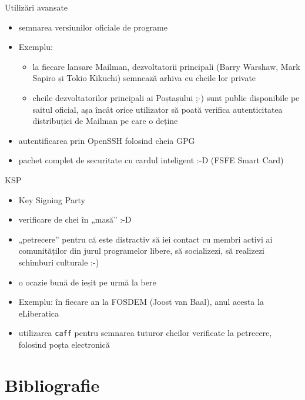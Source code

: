 \documentclass{beamer}
\begin{document}
\begin{frame}{Utilizări avansate}
  \begin{itemize}
    \item semnarea versiunilor oficiale de programe
    \item Exemplu:
    \begin{itemize}
      \item la fiecare lansare Mailman, dezvoltatorii principali (Barry
      Warshaw, Mark Sapiro și Tokio Kikuchi) semnează arhiva cu cheile lor
      private
      \item cheile dezvoltatorilor principali ai Poștașului ;-) sunt
      public disponibile pe saitul oficial, așa încât orice utilizator să
      poată verifica autenticitatea distribuției de Mailman pe care o deține
    \end{itemize}
    \item autentificarea prin OpenSSH folosind cheia GPG
    \item pachet complet de securitate cu cardul inteligent :-D (FSFE Smart
    Card)
  \end{itemize}
\end{frame}

\begin{frame}{KSP}
  \begin{itemize}
    \item Key Signing Party
    \item verificare de chei în „masă” :-D
    \item „petrecere” pentru că este distractiv să iei contact cu membri
    activi ai comunităților din jurul programelor libere, să socializezi,
    să realizezi schimburi culturale :-)
    \item o ocazie bună de ieșit pe urmă la bere
    \item Exemplu: în fiecare an la FOSDEM (Joost van Baal), anul acesta la
    eLiberatica
    \item utilizarea \texttt{caff} pentru semnarea tuturor cheilor verificate
    la petrecere, folosind poșta electronică
  \end{itemize}
\end{frame}

\section{Bibliografie}
\frame{\tableofcontents[currentsection]}
\end{document}
